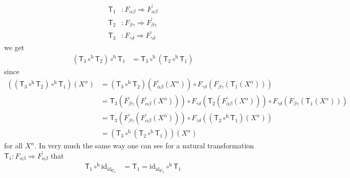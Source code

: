 \begin{align*}
  \mathsf{T}_{1}
  &\colon
  F_{\alpha\beta}
  \Rightarrow
  F_{\alpha\beta}^{\backprime}
  \\
  \mathsf{T}_{2}
  &\colon
  F_{\beta\gamma}
  \Rightarrow
  F_{\beta\gamma}^{\backprime}
  \\
  \mathsf{T}_{3}
  &\colon
  F_{\gamma\delta}
  \Rightarrow
  F_{\gamma\delta}^{\backprime}
\end{align*}
we get
\begin{align*}
  \left(
    \mathsf{T}_{3}
    \circ^{\textrm{h}}
    \mathsf{T}_{2}
  \right)
  \circ^{\textrm{h}}
  \mathsf{T}_{1}
  &=
  \mathsf{T}_{3}
  \circ^{\textrm{h}}
  \left(
    \mathsf{T}_{2}
    \circ^{\textrm{h}}
    \mathsf{T}_{1}
  \right)
\end{align*}
since
\begin{align*}
  \left(
    \left(
      \mathsf{T}_{3}
      \circ^{\textrm{h}}
      \mathsf{T}_{2}
    \right)
    \circ^{\textrm{h}}
    \mathsf{T}_{1}
  \right)
  (X^{\alpha})
  &=
  \left(
    \mathsf{T}_{3}
    \circ^{\textrm{h}}
    \mathsf{T}_{2}
  \right)
  \left(
    F_{\alpha\beta}^{\backprime}(X^{\alpha})
  \right)
  \circ
  F_{\gamma\delta}
  \left(
    F_{\beta\gamma}
    \left(
      \mathsf{T}_{1}(X^{\alpha})
    \right)
  \right)
  \\
  &=
  \mathsf{T}_{3}
  \left(
    F_{\beta\gamma}^{\backprime}
    \left(
      F_{\alpha\beta}^{\backprime}(X^{\alpha})
    \right)
  \right)
  \circ
  F_{\gamma\delta}
  \left(
    \mathsf{T}_{2}
    \left(
      F_{\alpha\beta}^{\backprime}(X^{\alpha})
    \right)
  \right)
  \circ
  F_{\gamma\delta}
  \left(
    F_{\beta\gamma}
    \left(
      \mathsf{T}_{1}(X^{\alpha})
    \right)
  \right)
  \\
  &=
  \mathsf{T}_{3}
  \left(
    F_{\beta\gamma}^{\backprime}
    \left(
      F_{\alpha\beta}^{\backprime}(X^{\alpha})
    \right)
  \right)
  \circ
  F_{\gamma\delta}
  \left(
    \left(
      \mathsf{T}_{2}
      \circ^{\textrm{h}}
      \mathsf{T}_{1}
    \right)
    (X^{\alpha})
  \right)
  \\
  &=
  \left(
    \mathsf{T}_{3}
    \circ^{\textrm{h}}
    \left(
      \mathsf{T}_{2}
      \circ^{\textrm{h}}
      \mathsf{T}_{1}
    \right)
  \right)
  (X^{\alpha})
\end{align*}
for all $X^{\alpha}$. In very much the same way one can see for a natural transformation $\mathsf{T}_{1} \colon F_{\alpha\beta} \Rightarrow F_{\alpha\beta}^{\backprime}$ that
\begin{align*}
  \mathsf{T}_{1}
  \circ^{\textrm{h}}
  \mathrm{id}_{\mathrm{id}_{\mathbf{C}_{\alpha}}}
  &=
  \mathsf{T}_{1}
  =
  \mathrm{id}_{\mathrm{id}_{\mathbf{C}_{\beta}}}
  \circ^{\textrm{h}}
  \mathsf{T}_{1}
\end{align*}

